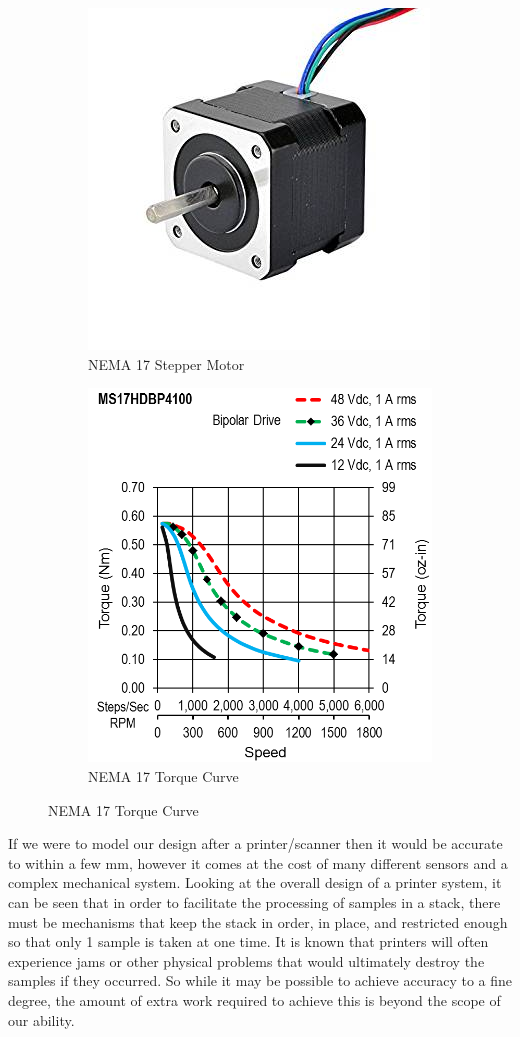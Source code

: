 \documentclass[11pt]{article}
\begin{document}
\begin{figure}[H]
    \centering
    \begin{subfigure}{.4\textwidth}
        \centering
        \includegraphics[width = .7\textwidth]{NEMA17.jpg}
        \caption{NEMA 17 Stepper Motor}
        \label{fig:NEMA17Step}
    \end{subfigure}
    \begin{subfigure}{.4\textwidth}
        \centering
        \includegraphics[width = .7\textwidth]{Torque_NEMA17.png}
        \caption{NEMA 17 Torque Curve \cite{NEMATorque}}
        \label{fig:NEMA17torque}
    \end{subfigure}
\end{figure}

If we were to model our design after a printer/scanner then it would be accurate to within a few mm, however it comes at the cost of many different sensors and a complex mechanical system. Looking at the overall design of a printer system, it can be seen that in order to facilitate the processing of samples in a stack, there must be mechanisms that keep the stack in order, in place, and restricted enough so that only 1 sample is taken at one time. It is known that printers will often experience jams or other physical problems that would ultimately destroy the samples if they occurred. So while it may be possible to achieve accuracy to a fine degree, the amount of extra work required to achieve this is beyond the scope of our ability. 
\end{document}
